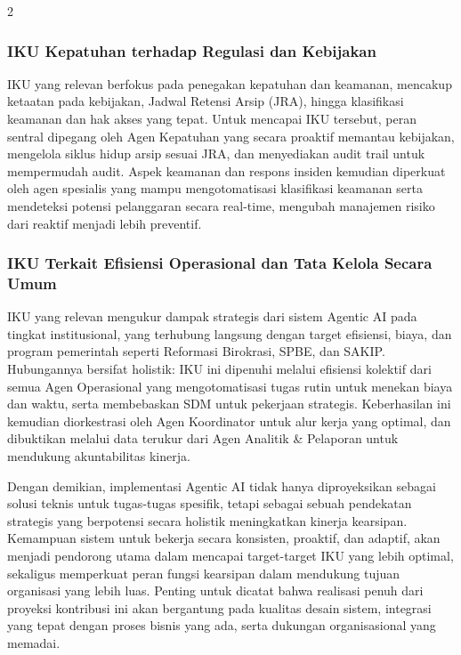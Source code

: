\documentclass[12pt,a4paper]{article}
\begin{document}
\begin{multicols}{2}
\subsubsection{IKU Kepatuhan terhadap Regulasi dan Kebijakan}

IKU yang relevan berfokus pada penegakan kepatuhan dan keamanan, mencakup ketaatan pada kebijakan, Jadwal Retensi Arsip (JRA), hingga klasifikasi keamanan dan hak akses yang tepat. Untuk mencapai IKU tersebut, peran sentral dipegang oleh Agen Kepatuhan yang secara proaktif memantau kebijakan, mengelola siklus hidup arsip sesuai JRA, dan menyediakan audit trail untuk mempermudah audit. Aspek keamanan dan respons insiden kemudian diperkuat oleh agen spesialis yang mampu mengotomatisasi klasifikasi keamanan serta mendeteksi potensi pelanggaran secara real-time, mengubah manajemen risiko dari reaktif menjadi lebih preventif.

\subsubsection{IKU Terkait Efisiensi Operasional dan Tata Kelola Secara Umum}

IKU yang relevan mengukur dampak strategis dari sistem Agentic AI pada tingkat institusional, yang terhubung langsung dengan target efisiensi, biaya, dan program pemerintah seperti Reformasi Birokrasi, SPBE, dan SAKIP. Hubungannya bersifat holistik: IKU ini dipenuhi melalui efisiensi kolektif dari semua Agen Operasional yang mengotomatisasi tugas rutin untuk menekan biaya dan waktu, serta membebaskan SDM untuk pekerjaan strategis. Keberhasilan ini kemudian diorkestrasi oleh Agen Koordinator untuk alur kerja yang optimal, dan dibuktikan melalui data terukur dari Agen Analitik \& Pelaporan untuk mendukung akuntabilitas kinerja.

Dengan demikian, implementasi Agentic AI tidak hanya diproyeksikan sebagai solusi teknis untuk tugas-tugas spesifik, tetapi sebagai sebuah pendekatan strategis yang berpotensi secara holistik meningkatkan kinerja kearsipan. Kemampuan sistem untuk bekerja secara konsisten, proaktif, dan adaptif, akan menjadi pendorong utama dalam mencapai target-target IKU yang lebih optimal, sekaligus memperkuat peran fungsi kearsipan dalam mendukung tujuan organisasi yang lebih luas. Penting untuk dicatat bahwa realisasi penuh dari proyeksi kontribusi ini akan bergantung pada kualitas desain sistem, integrasi yang tepat dengan proses bisnis yang ada, serta dukungan organisasional yang memadai.


\end{multicols}
\end{document}
